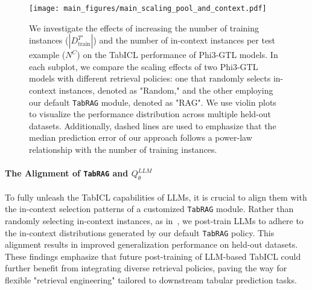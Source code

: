 \begin{figure*}[t]
\vskip 0.2in
\begin{center}
\centerline{\texttt{[image: main\_figures/main\_scaling\_pool\_and\_context.pdf]}}
\caption{
We investigate the effects of increasing the number of training instances ($|D_{\text{train}}^{T'}|$) and the number of in-context instances per test example ($N^C$) on the TabICL performance of Phi3-GTL models.
In each subplot, we compare the scaling effects of two Phi3-GTL models with different retrieval policies: one that randomly selects in-context instances, denoted as "Random," and the other employing our default \texttt{TabRAG} module, denoted as "RAG".
We use violin plots to visualize the performance distribution across multiple held-out datasets. Additionally, dashed lines are used to emphasize that the median prediction error of our approach follows a power-law relationship with the number of training instances.
}
\label{fig:scaling_pool_ctx}
\end{center}
\vskip -0.2in
\end{figure*}



\paragraph{The Alignment of \texttt{TabRAG} and $Q^{LLM}_\theta$}
To fully unleash the TabICL capabilities of LLMs, it is crucial to align them with the in-context selection patterns of a customized \texttt{TabRAG} module.
Rather than randomly selecting in-context instances, as in~\citep{wen2024GTL}, we post-train LLMs to adhere to the in-context distributions generated by our default \texttt{TabRAG} policy. This alignment results in improved generalization performance on held-out datasets.
These findings emphasize that future post-training of LLM-based TabICL could further benefit from integrating diverse retrieval policies, paving the way for flexible "retrieval engineering" tailored to downstream tabular prediction tasks.




